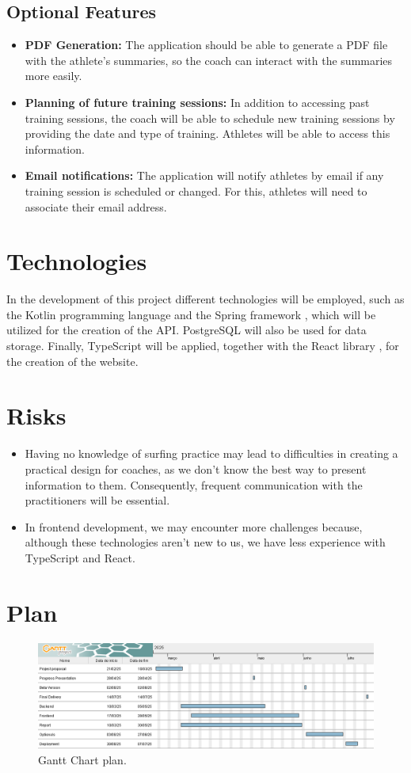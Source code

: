 \documentclass[a4paper,twoside,11pt]{article}
\begin{document}
\subsection{Optional Features}
\begin{itemize}
\item \textbf{PDF Generation:} The application should be able to generate a PDF file with the athlete's summaries, so the coach can interact with the summaries more easily.
\item \textbf{Planning of future training sessions:} In addition to accessing past training sessions, the coach will be able to schedule new training sessions by providing the date and type of training. Athletes will be able to access this information.
\item \textbf{Email notifications:} The application will notify athletes by email if any training session is scheduled or changed. For this, athletes will need to associate their email address.
\end{itemize}

\section{Technologies}
In the development of this project different technologies will be employed, such as the Kotlin programming language \cite{kotlin} and the Spring framework \cite{spring}, which will be utilized for the creation of the API. PostgreSQL \cite{postgresql} will also be used for data storage. Finally, TypeScript \cite{typescript} will be applied, together with the React library \cite{react}, for the creation of the website.

\section{Risks}
\begin{itemize}
\item Having no knowledge of surfing practice may lead to difficulties in creating a practical design for coaches, as we don’t know the best way to present information to them. Consequently, frequent communication with the practitioners will be essential.
\item In frontend development, we may encounter more challenges because, although these technologies aren't new to us, we have less experience with TypeScript and React.
\end{itemize}

\section{Plan}
\begin{figure}[h]
\centering
\includegraphics [width=6in]{GanttChart.png}
\caption{Gantt Chart plan.}
\end{figure}



\end{document}
